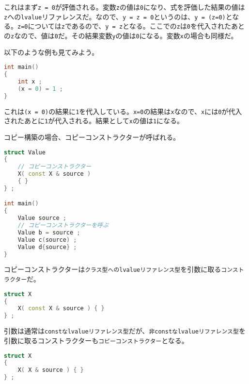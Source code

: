これはまず\texttt{z = 0}が評価される。変数\texttt{z}の値は\texttt{0}になり、式を評価した結果の値は\texttt{z}への\texttt{lvalue}リファレンスだ。なので、\texttt{y = z = 0}というのは、\texttt{y = (z=0)}となる。\texttt{z=0}については\texttt{z}であるので、\texttt{y = z}となる。ここでの\texttt{z}は\texttt{0}を代入されたあとの\texttt{z}なので、値は\texttt{0}だ。その結果変数\texttt{y}の値は\texttt{0}になる。変数\texttt{x}の場合も同様だ。

以下のような例も見てみよう。

\begin{lstlisting}[language={C++}]
int main()
{
    int x ;
    (x = 0) = 1 ;
}
\end{lstlisting}

これは\texttt{(x = 0)}の結果に\texttt{1}を代入している。\texttt{x=0}の結果は\texttt{x}なので、\texttt{x}には\texttt{0}が代入されたあとに\texttt{1}が代入される。結果として\texttt{x}の値は\texttt{1}になる。

\clearpage
{}

コピー構築の場合、コピーコンストラクターが呼ばれる。

\begin{lstlisting}[language={C++}]
struct Value
{
    // コピーコンストラクター
    X( const X & source )
    { }
} ;

int main()
{
    Value source ;
    // コピーコンストラクターを呼ぶ
    Value b = source ;
    Value c(source) ;
    Value d{source} ;
}
\end{lstlisting}

コピーコンストラクターは\texttt{クラス型へのlvalueリファレンス型}を引数に取る\texttt{コンストラクター}だ。

\begin{lstlisting}[language={C++}]
struct X
{
    X( const X & source ) { }
} ;
\end{lstlisting}

引数は通常は\texttt{constなlvalueリファレンス型}だが、\texttt{非constなlvalueリファレンス型}を引数に取るコンストラクターも\texttt{コピーコンストラクター}となる。

\begin{lstlisting}[language={C++}]
struct X
{
    X( X & source ) { }
} ;
\end{lstlisting}

